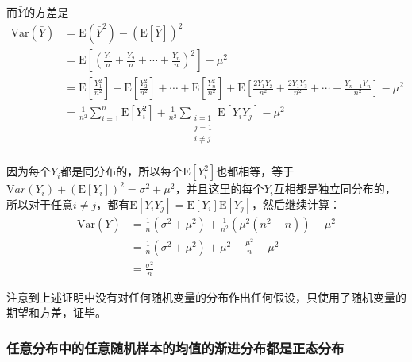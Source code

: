 \documentclass[UTF8]{ctexbook}
\begin{document}
而$\bar Y$的方差是
\begin{align*}
	\mathrm {Var}(\bar Y)&=\mathrm E(\bar Y^2)-(\mathrm E[\bar Y])^2\\
	&=\mathrm E[(\frac{Y_1}{n}+\frac{Y_2}{n}+\cdots+\frac{Y_n}{n})^2]-\mu^2\\
	&=\mathrm E[\frac{Y_1^2}{n^2}]+\mathrm E[\frac{Y_2^2}{n^2}]+\cdots+\mathrm E[\frac{Y_n^2}{n^2}]+\mathrm E[\frac{2Y_1Y_2}{n^2}+\frac{2Y_1Y_3}{n^2}+\cdots+\frac{Y_{n-1}Y_n}{n^2}]-\mu^2\\
	&=\frac{1}{n^2}\sum_{i=1}^n\mathrm E[Y_i^2]+\frac{1}{n^2}\sum_{\substack{i=1\\j=1\\i\neq j}}\mathrm E[Y_iY_j]-\mu^2\\
\end{align*}

因为每个$Y_i$都是同分布的，所以每个$\mathrm E[Y_i^2]$也都相等，等于$\mathrm Var(Y_i)+(\mathrm E[Y_i])^2=\sigma^2+\mu^2$，并且这里的每个$Y_i$互相都是独立同分布的，所以对于任意$i\neq j$，都有$\mathrm E[Y_iY_j]=\mathrm E[Y_i]\mathrm E[Y_j]$，然后继续计算：
\begin{align*}
	\mathrm {Var}(\bar Y)&=\frac{1}{n}(\sigma^2+\mu^2)+\frac{1}{n^2}(\mu^2(n^2-n))-\mu^2\\
	&=\frac{1}{n}(\sigma^2+\mu^2)+\mu^2-\frac{\mu^2}{n}-\mu^2\\
	&=\frac{\sigma^2}{n}
\end{align*}

注意到上述证明中没有对任何随机变量的分布作出任何假设，只使用了随机变量的期望和方差，证毕。

\subsubsection{任意分布中的任意随机样本的均值的渐进分布都是正态分布}
\label{any-dist-avg-aspt-normal}
\end{document}

